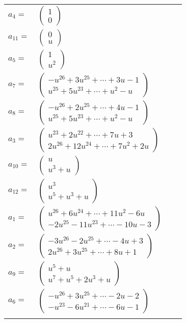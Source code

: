 \documentclass[1p]{elsarticle_modified}
\theoremstyle{definition}
\begin{document}
\begin{tabular}{m{7pt} m{180pt} m{7pt} m{180pt} }
\flushright $a_{4}=$&$\begin{pmatrix}1\\0\end{pmatrix}$ \\
\flushright $a_{11}=$&$\begin{pmatrix}0\\u\end{pmatrix}$ \\
\flushright $a_{5}=$&$\begin{pmatrix}1\\u^2\end{pmatrix}$ \\
\flushright $a_{7}=$&$\begin{pmatrix}- u^{26}+3 u^{25}+\cdots+3 u-1\\u^{25}+5 u^{23}+\cdots+u^2- u\end{pmatrix}$ \\
\flushright $a_{8}=$&$\begin{pmatrix}- u^{26}+2 u^{25}+\cdots+4 u-1\\u^{25}+5 u^{23}+\cdots+u^2- u\end{pmatrix}$ \\
\flushright $a_{3}=$&$\begin{pmatrix}u^{23}+2 u^{22}+\cdots+7 u+3\\2 u^{26}+12 u^{24}+\cdots+7 u^2+2 u\end{pmatrix}$ \\
\flushright $a_{10}=$&$\begin{pmatrix}u\\u^3+u\end{pmatrix}$ \\
\flushright $a_{12}=$&$\begin{pmatrix}u^3\\u^5+u^3+u\end{pmatrix}$ \\
\flushright $a_{1}=$&$\begin{pmatrix}u^{26}+6 u^{24}+\cdots+11 u^2-6 u\\-2 u^{25}-11 u^{23}+\cdots-10 u-3\end{pmatrix}$ \\
\flushright $a_{2}=$&$\begin{pmatrix}-3 u^{26}-2 u^{25}+\cdots-4 u+3\\2 u^{26}+3 u^{25}+\cdots+8 u+1\end{pmatrix}$ \\
\flushright $a_{9}=$&$\begin{pmatrix}u^5+u\\u^7+u^5+2 u^3+u\end{pmatrix}$ \\
\flushright $a_{6}=$&$\begin{pmatrix}- u^{26}+3 u^{25}+\cdots-2 u-2\\- u^{23}-6 u^{21}+\cdots-6 u-1\end{pmatrix}$\\&\end{tabular}
\end{document}
